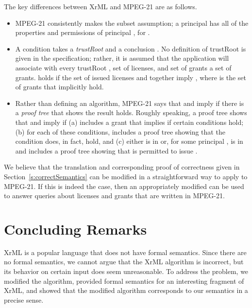 \documentclass{acmtrans2m}
\newcommand{\<}{
}
\renewcommand{\>}{\rangle}
\begin{document}
The key differences between XrML and MPEG-21 are as follows.
\begin{itemize}
\item MPEG-21
consistently makes the subset assumption;
a principal  has
all of the properties and permissions of principal , for .
\item A  condition takes a \emph{trustRoot}  and a conclusion .  No definition of trustRoot
is given in the specification; rather, it is assumed that the application will associate with every
trustRoot , set  of licenses, and set  of grants a set  of grants.  
holds if the set  of issued licenses and  together imply , where  is the set of
grants that implicitly hold.
\item Rather than defining an algorithm, MPEG-21 says that  and  imply  if there is a
\emph{proof tree} that shows the result holds.  Roughly speaking, a proof tree  shows that  and 
imply  if (a)  includes a grant  that implies  if certain conditions hold; (b) for each of
these conditions,  includes a proof tree showing that the condition does, in fact, hold, and (c) either
 is in  or, for some principal ,  is in  and  includes a proof tree showing that 
is permitted to issue .
\end {itemize}
We believe that the translation and corresponding proof of correctness given in
Section~\ref{s:correctSemantics}
can be modified in a straightforward way to apply to MPEG-21.  If this is
indeed the case, then an appropriately modified  can be used
to answer queries about licenses and
grants that are written in MPEG-21.

\section{Concluding Remarks}\label{s:concl}
XrML is a popular language that does not have formal semantics.  Since there are no formal semantics,
we cannot argue that the XrML algorithm is incorrect, but its behavior on certain input does seem
unreasonable.  To address the problem, we modified the algorithm, provided formal semantics for
an interesting fragment of XrML,
and showed that the modified algorithm
corresponds to our semantics in a precise sense.
\end{document}

